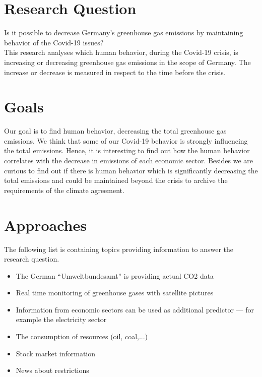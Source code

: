 \documentclass[lang=english,inputenc=utf8,fontsize=10pt]{ldvarticle}
\begin{document}
\section*{Research Question}
Is it possible to decrease Germany's greenhouse gas emissions by maintaining behavior of the Covid-19 issues?\\
This research analyses which human behavior, during the Covid-19 crisis, is increasing or decreasing greenhouse gas emissions in the scope of Germany. The increase or decrease is measured in respect to the time before the crisis.\\

\section*{Goals}
Our goal is to find human behavior, decreasing the total greenhouse gas emissions. We think that some of our Covid-19 behavior is strongly influencing the total emissions. Hence, it is interesting to find out how the human behavior correlates with the decrease in emissions of each economic sector. Besides we are curious to find out if there is human behavior which is significantly decreasing the total emissions and could be maintained beyond the crisis to archive the requirements of the climate agreement.\\

\section*{Approaches}
The following list is containing topics providing information to answer the research question.\\


\begin{itemize}
    \item The German \enquote{Umweltbundesamt} is providing actual CO2 data
    \item Real time monitoring of greenhouse gases with satellite pictures
    \item Information from economic sectors can be used as additional predictor --- for example the electricity sector
    \item The consumption of resources (oil, coal,...)
    \item Stock market information
    \item News about restrictions
\end{itemize}
\end{document}
